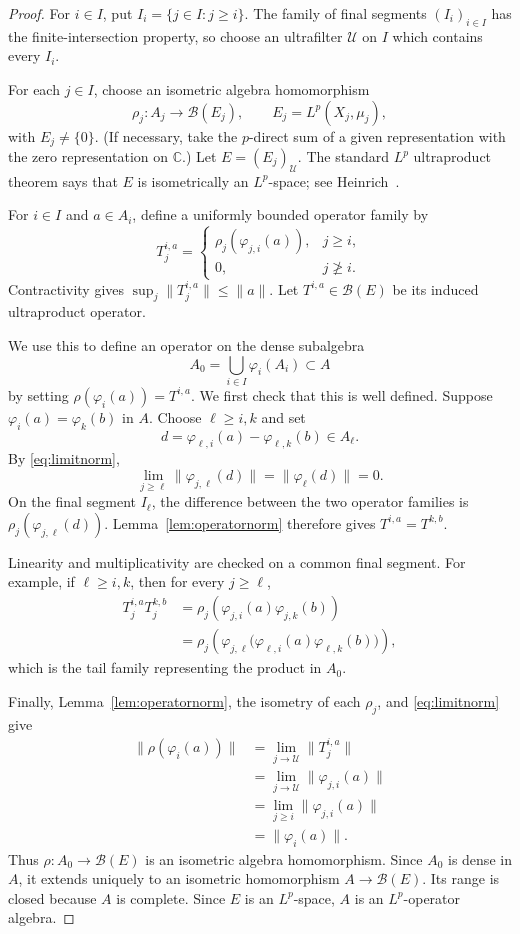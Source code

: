 \documentclass[11pt]{article}
\newcommand{\B}{\mathcal B}
\newcommand{\U}{\mathcal U}
\begin{document}
\begin{proof}
For $i\in I$, put $I_i=\{j\in I:j\ge i\}$.  The family of final segments
$(I_i)_{i\in I}$ has the finite-intersection property, so choose an ultrafilter
$\U$ on $I$ which contains every $I_i$.

For each $j\in I$, choose an isometric algebra homomorphism
\[
 \rho_j:A_j\longrightarrow\B(E_j),
 \qquad E_j=L^p(X_j,\mu_j),
\]
with $E_j\ne\{0\}$.  (If necessary, take the $p$-direct sum of a given
representation with the zero representation on $\mathbb C$.)
Let $E=(E_j)_\U$.  The standard $L^p$ ultraproduct theorem says that $E$ is
isometrically an $L^p$-space; see Heinrich~\cite{Heinrich}.

For $i\in I$ and $a\in A_i$, define a uniformly bounded operator family by
\[
 T_j^{i,a}=
 \begin{cases}
  \rho_j(\varphi_{j,i}(a)),&j\ge i,\\
  0,&j\not\ge i.
 \end{cases}
\]
Contractivity gives $\sup_j\|T_j^{i,a}\|\le\|a\|$.  Let
$T^{i,a}\in\B(E)$ be its induced ultraproduct operator.

We use this to define an operator on the dense subalgebra
\[
 A_0=\bigcup_{i\in I}\varphi_i(A_i)\subset A
\]
by setting $\rho(\varphi_i(a))=T^{i,a}$.  We first check that this is well
defined.  Suppose $\varphi_i(a)=\varphi_k(b)$ in $A$.  Choose
$\ell\ge i,k$ and set
\[
 d=\varphi_{\ell,i}(a)-\varphi_{\ell,k}(b)\in A_\ell.
\]
By \eqref{eq:limitnorm},
\[
 \lim_{j\ge\ell}\|\varphi_{j,\ell}(d)\|
 =\|\varphi_\ell(d)\|=0.
\]
On the final segment $I_\ell$, the difference between the two operator
families is $\rho_j(\varphi_{j,\ell}(d))$.  Lemma~\ref{lem:operatornorm}
therefore gives $T^{i,a}=T^{k,b}$.

Linearity and multiplicativity are checked on a common final segment.  For
example, if $\ell\ge i,k$, then for every $j\ge\ell$,
\begin{align*}
 T_j^{i,a}T_j^{k,b}
 &=\rho_j\!\left(\varphi_{j,i}(a)\varphi_{j,k}(b)\right)\\
 &=\rho_j\!\left(
   \varphi_{j,\ell}\big(\varphi_{\ell,i}(a)
                    \varphi_{\ell,k}(b)\big)\right),
\end{align*}
which is the tail family representing the product in $A_0$.

Finally, Lemma~\ref{lem:operatornorm}, the isometry of each $\rho_j$, and
\eqref{eq:limitnorm} give
\begin{align*}
 \|\rho(\varphi_i(a))\|
 &=\lim_{j\to\U}\|T_j^{i,a}\|\\
 &=\lim_{j\to\U}\|\varphi_{j,i}(a)\|\\
 &=\lim_{j\ge i}\|\varphi_{j,i}(a)\|\\
 &=\|\varphi_i(a)\|.
\end{align*}
Thus $\rho:A_0\to\B(E)$ is an isometric algebra homomorphism.  Since $A_0$
is dense in $A$, it extends uniquely to an isometric homomorphism
$A\to\B(E)$.  Its range is closed because $A$ is complete.  Since $E$ is an
$L^p$-space, $A$ is an $L^p$-operator algebra.
\end{proof}
\end{document}
